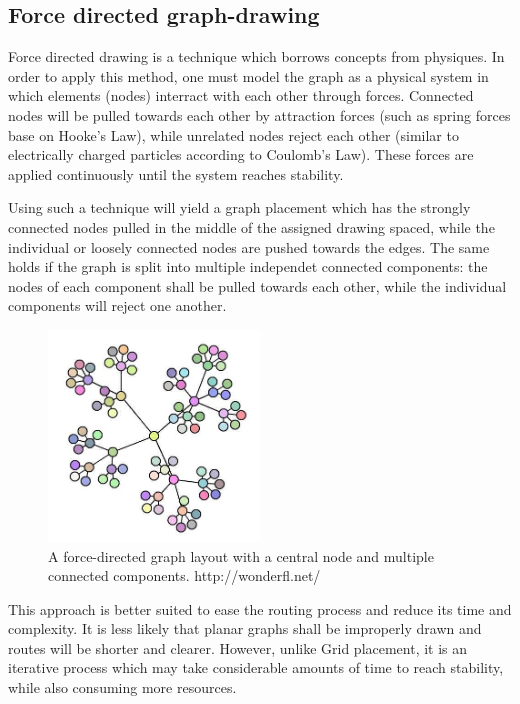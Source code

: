 \subsection{Force directed graph-drawing}

Force directed drawing is a technique which borrows concepts from physiques. In order to apply this method, one must model the graph as a 
physical system in which elements (nodes) interract with each other through forces. Connected nodes will be pulled towards each other by 
attraction forces (such as spring forces base on Hooke's Law), while unrelated nodes reject each other (similar to electrically charged particles
according to Coulomb's Law). These forces are applied continuously until the system reaches stability.

Using such a technique will yield a graph placement which has the strongly connected nodes pulled in the middle of the assigned drawing spaced, while the 
individual or loosely connected nodes are pushed towards the edges. The same holds if the graph is split into multiple independet connected components: 
the nodes of each component shall be pulled towards each other, while the individual components will reject one another.

\begin{figure}[ht] \centering
\includegraphics[width=0.5\textwidth]{img/algdesing/force_directed_example.jpg}
\caption{A force-directed graph layout with a central node and multiple connected components.  http://wonderfl.net/} \end{figure}

This approach is better suited to ease the routing process and reduce its time and complexity. It is less likely that planar graphs shall be 
improperly drawn and routes will be shorter and clearer. However, unlike Grid placement, it is an iterative process which may take considerable 
amounts of time to reach stability, while also consuming more resources.

